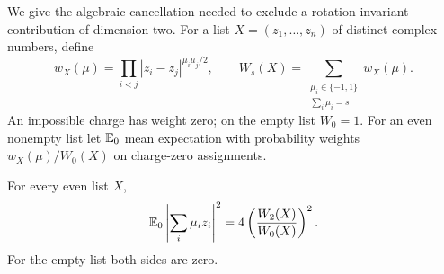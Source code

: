 We give the algebraic cancellation needed to exclude a
rotation-invariant contribution of dimension two.  For a list
$X=(z_1,\ldots,z_n)$ of distinct complex numbers, define
\[
 w_X(\mu)=\prod_{i<j}|z_i-z_j|^{\mu_i\mu_j/2},
 \qquad
 W_s(X)=\sum_{\substack{\mu_i\in\{-1,1\}\\\sum_i\mu_i=s}}
                    w_X(\mu).
\]
An impossible charge has weight zero; on the empty list $W_0=1$.
For an even nonempty list let $\mathbb E_0$ mean expectation with probability
weights $w_X(\mu)/W_0(X)$ on charge-zero assignments.

\begin{lemma}
\label{rad:identity}
For every even list $X$,
\begin{equation}
 \mathbb E_0\left|\sum_i\mu_i z_i\right|^2
       =4\left(\frac{W_2(X)}{W_0(X)}\right)^2.
 \label{eq:rad-charge-identity}
\end{equation}
For the empty list both sides are zero.
\end{lemma}


